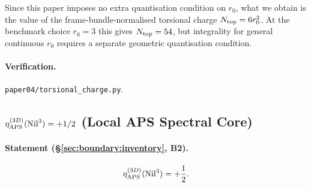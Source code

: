Since this paper imposes no extra quantisation condition on $r_0$, what we
obtain is the value of the frame-bundle-normalised torsional charge
$N_{\mathrm{top}} = 6 r_0^2$.  At the benchmark choice $r_0 = 3$ this gives
$N_{\mathrm{top}} = 54$, but integrality for general continuous $r_0$ requires a
separate geometric quantisation condition.

\paragraph{Verification.}
\texttt{paper04/torsional\_charge.py}.

\subsection{$\eta_{\mathrm{APS}}^{(3D)}(\mathrm{Nil}^3) = +1/2$ (Local APS Spectral Core)}
\label{app:E:E10}

\paragraph{Statement (\S\ref{sec:boundary:inventory}, B2).}
\begin{equation}
  \eta_{\mathrm{APS}}^{(3D)}(\mathrm{Nil}^3) = +\frac{1}{2}.
\end{equation}

